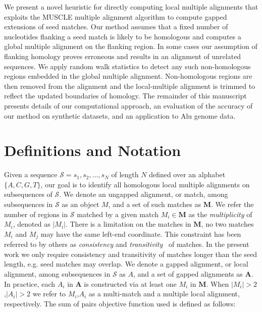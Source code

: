 \documentclass[twoside,11pt]{article}
\begin{document}
We present a novel heuristic for directly computing local multiple alignments that exploits the MUSCLE multiple alignment algorithm to compute gapped extensions of seed matches.  Our method assumes that a fixed number of nucleotides flanking a seed match is likely to be homologous and computes a global multiple alignment on the flanking region.  In some cases our assumption of flanking homology proves erroneous and results in an alignment of unrelated sequences.  We apply random walk statistics to detect any such non-homologous regions embedded in the global multiple alignment.  Non-homologous regions are then removed from the alignment and the local-multiple alignment is trimmed to reflect the updated boundaries of homology.  The remainder of this manuscript presents details of our computational approach, an evaluation of the accuracy of our method on synthetic datasets, and an application to Alu genome data.



\label{sec:overview}
\section{Definitions and Notation}

Given a sequence $\mathcal{S}=s_1, s_2,\dots, s_N$ of length $N$
defined over an alphabet $\{A,C,G,T\}$, our goal is to identify all homologous
local multiple alignments on subsequences of $\mathcal{S}$. We denote
an ungapped alignment, or match, among subsequences in $\mathcal{S}$
as an object $M$, and a set of such matches as $\mathbf{M}$.  
We refer the number of regions in $\mathcal{S}$
matched by a given match $M_i \in \mathbf{M}$ as the
\textit{multiplicity} of $M_i$, denoted as $|M_i|$. There is a limitation on the matches in
$\mathbf{M}$, no two matches $M_i$ and $M_j$ may have the same
left-end coordinate.  This constraint has been referred to by others as \textit{consistency} and
\textit{transitivity}~\cite{ref-transitivity} of matches.  In the
present work we only require consistency and transitivity of matches
longer than the seed length, e.g. seed matches may overlap. We denote a gapped alignment, or local alignment, among subsequences in $\mathcal{S}$ as $A$, and a set of gapped alignments as $\mathbf{A}$.  In practice, each $A_i$ in $\mathbf{A}$ is constructed via
at least one $M_i$ in $\mathbf{M}$. When $|M_i|>2$,$|A_i|>2$ we refer to $M_i$,$A_i$ as
a multi-match and a multiple local alignment, respectively.  The sum of pairs objective function used is defined as follows:\\
\end{document}
